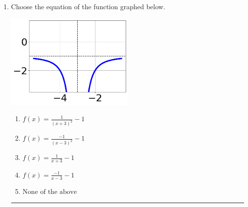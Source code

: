 \documentclass[14pt]{extbook}
\newcommand{\litem}[1]{\item#1\hspace*{-1cm}\rule{\textwidth}{0.4pt}}
\begin{document}
\begin{enumerate}
{\begin{enumerate}[label=\Alph*.]
\end{enumerate} }
\litem{
Choose the equation of the function graphed below.
\begin{center}
    \includegraphics[width=0.5\textwidth]{../Figures/rationalGraphToEquationA.png}
\end{center}
\begin{enumerate}[label=\Alph*.]
\item \( f(x) = \frac{1}{(x + 3)^2} - 1 \)
\item \( f(x) = \frac{-1}{(x - 3)^2} - 1 \)
\item \( f(x) = \frac{1}{x + 3} - 1 \)
\item \( f(x) = \frac{-1}{x - 3} - 1 \)
\item \( \text{None of the above} \)


\end{enumerate}}
\end{enumerate}
\end{document}

